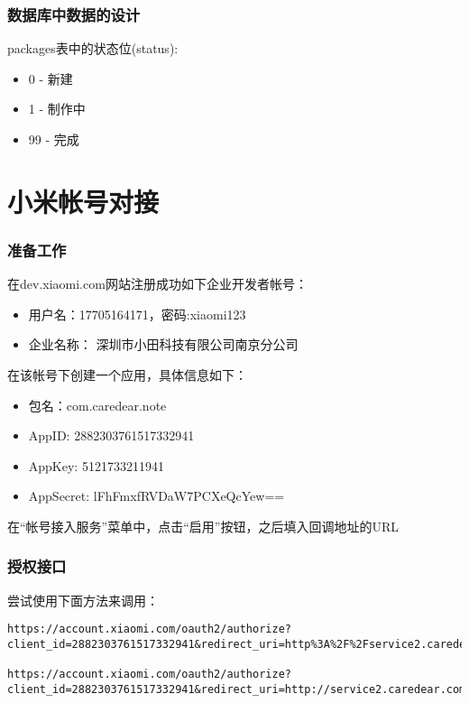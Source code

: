 \documentclass{beamer}
\begin{document}
\begin{frame}
 \frametitle{数据库中数据的设计}

packages表中的状态位(status):
\begin{itemize}
 \item 0 - 新建
 \item 1 - 制作中
 \item 99 - 完成
\end{itemize}


\end{frame}




\section{小米帐号对接}

\begin{frame}
\frametitle{准备工作}
在dev.xiaomi.com网站注册成功如下企业开发者帐号：
\begin{itemize}
 \item 用户名：17705164171，密码:xiaomi123
 \item 企业名称： 深圳市小田科技有限公司南京分公司
\end{itemize}

在该帐号下创建一个应用，具体信息如下：
\begin{itemize}
 \item 包名：com.caredear.note
 \item AppID: 2882303761517332941
 \item AppKey: 5121733211941
 \item AppSecret: lFhFmxfRVDaW7PCXeQcYew==
\end{itemize}

在“帐号接入服务”菜单中，点击“启用”按钮，之后填入回调地址的URL

\end{frame}

\begin{frame}[fragile]
\frametitle{授权接口}


尝试使用下面方法来调用：
\begin{lstlisting}
https://account.xiaomi.com/oauth2/authorize?client_id=2882303761517332941&redirect_uri=http%3A%2F%2Fservice2.caredear.com%2Fv1%2Fuc%2Fxiaomiaccount&response_type=token&userId=861457562

https://account.xiaomi.com/oauth2/authorize?client_id=2882303761517332941&redirect_uri=http://service2.caredear.com/v1/uc/xiaomiaccount&response_type=token
\end{lstlisting}


\end{frame}
\end{document}
